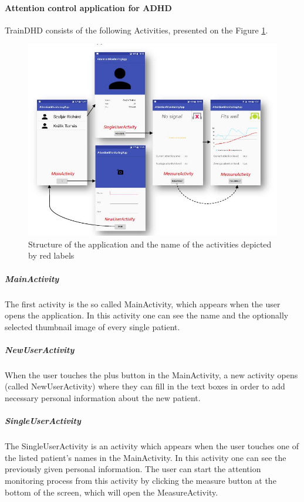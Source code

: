\documentclass[letterpaper,10pt]{article}
\begin{document}
\paragraph{Attention control application for ADHD}

TrainDHD consists of the following Activities, presented on the Figure \ref{img:prototype}. 

\begin{figure}[h]
\centering
\includegraphics[scale=0.5]{prototype.JPG}
\caption[Structure of the application and the name of the activities depicted by red labels]{Structure of the application and the name of the activities depicted by red labels \cite{RicsiSzakdoga} }
\label{img:prototype}
\end{figure}

\subparagraph{MainActivity}
The first activity is the so called MainActivity, which appears when the user opens the application. In this activity one can see the name and the optionally selected thumbnail image of every single patient. \cite{RicsiSzakdoga}

\subparagraph{NewUserActivity}
When the user touches the plus button in the MainActivity, a new activity opens (called NewUserActivity) where they can fill in the text boxes in order to add necessary personal information about the new patient. \cite{RicsiSzakdoga}

\subparagraph{SingleUserActivity}
The SingleUserActivity is an activity which appears when the user touches one of the listed patient's names in the MainActivity. In this activity one can see the previously given personal information. The user can start the attention monitoring process from this activity by clicking the measure button at the bottom of the screen, which will open the MeasureActivity. \cite{RicsiSzakdoga}
\end{document}
